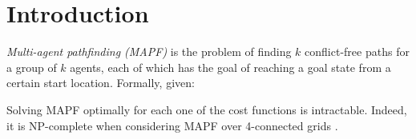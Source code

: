 \section{Introduction}

\emph{Multi-agent pathfinding (MAPF)} is the problem of finding $k$ conflict-free paths for a group of $k$ agents, each of which has the goal of reaching a goal state from a certain start location. Formally, given:


 Solving MAPF optimally for each one of the cost functions is intractable. Indeed, it is NP-complete when considering MAPF over 4-connected grids \cite{YuL13}.

